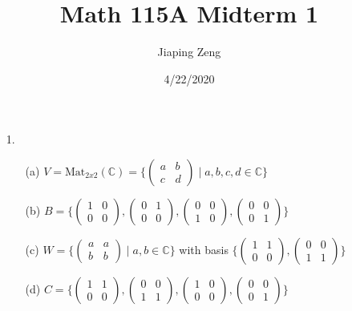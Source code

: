 \documentclass{article}
\title{Math 115A Midterm 1}
\author{Jiaping Zeng}
\date{4/22/2020}
\begin{document}
\begin{itemize}
	\item [1.]
	      \begin{itemize}
		      \item [(a)] $V=\text{Mat}_{2x2}(\mathbb{C})=\{\begin{pmatrix}a&b\\c&d\end{pmatrix} \mid a,b,c,d \in \mathbb{C}\}$
		      \item [(b)] $B=\{\begin{pmatrix}1&0\\0&0\end{pmatrix}, \begin{pmatrix}0&1\\0&0\end{pmatrix}, \begin{pmatrix}0&0\\1&0\end{pmatrix}, \begin{pmatrix}0&0\\0&1\end{pmatrix}\}$
		      \item [(c)] $W=\{\begin{pmatrix}a&a\\b&b\end{pmatrix} \mid a,b \in \mathbb{C}\}$ with basis $\{\begin{pmatrix}1&1\\0&0\end{pmatrix}, \begin{pmatrix}0&0\\1&1\end{pmatrix}\}$
		      \item [(d)] $C=\{\begin{pmatrix}1&1\\0&0\end{pmatrix}, \begin{pmatrix}0&0\\1&1\end{pmatrix}, \begin{pmatrix}1&0\\0&0\end{pmatrix}, \begin{pmatrix}0&0\\0&1\end{pmatrix}\}$
	      \end{itemize}
\end{itemize}
\newpage
\end{document}
